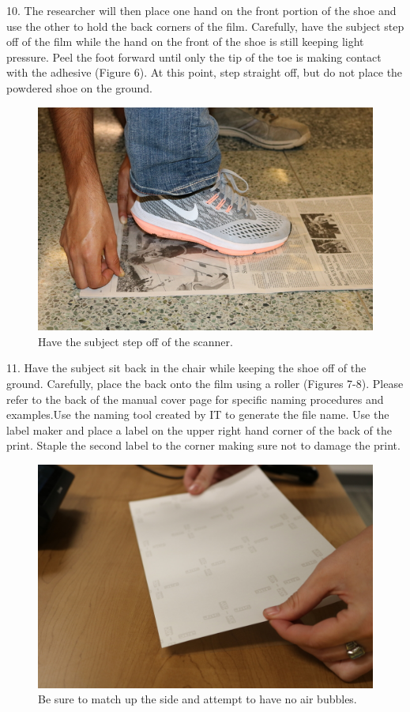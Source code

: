 10. The researcher will then place one hand on the front portion of the shoe and use the other to hold the back corners of the film. Carefully, have the subject step off of the film while the hand on the front of the shoe is still keeping light pressure. Peel the foot forward until only the tip of the toe is making contact with the adhesive (Figure 6). At this point, step straight off, but do not place the powdered shoe on the ground. 

\begin{figure}[!htp]
\centering
\includegraphics[scale=0.4]{Film_Lift}
\caption{Have the subject step off of the scanner.}
\label{Figure 6}
\end{figure}

11. Have the subject sit back in the chair while keeping the shoe off of the ground. Carefully, place the back onto the film using a roller (Figures 7-8). Please refer to the back of the manual cover page for specific naming procedures and examples.Use the naming tool created by IT to generate the file name. Use the label maker and place a label on the upper right hand corner of the back of the print. Staple the second label to the corner making sure not to damage the print. 

\begin{figure}[!htp]
\centering
\includegraphics[scale=0.25]{Film_Back}
\caption{Be sure to match up the side and attempt to have no air bubbles.}
\label{Figure 7}
\end{figure}

